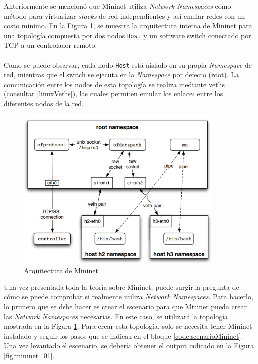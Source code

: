 Anteriormente se mencionó que Mininet utiliza \textit{Network Namespaces} como método para virtualizar \textit{stacks} de red independientes y así emular redes con un costo mínimo. En la Figura \ref{fig:mininet_arch}, se muestra la arquitectura interna de Mininet para una topología compuesta por dos nodos \texttt{Host} y un software switch conectado por TCP a un controlador remoto.\\
\\
Como se puede observar, cada nodo \texttt{Host} está aislado en su propia \textit{Namespace} de red, mientras que el switch se ejecuta en la \textit{Namespace} por defecto (root). La comunicación entre los nodos de esta topología se realiza mediante \gls{veth}s (consultar \ref{linuxVeths}), las cuales permiten emular los enlaces entre los diferentes nodos de la red.\\

\begin{figure}[ht]
    \centering
    \includegraphics[width=0.9\textwidth]{archivos/img/teoria/mn_arch.png}
    \caption{Arquitectura de Mininet \cite{heller2013reproducible}}
    \label{fig:mininet_arch}
\end{figure}

Una vez presentada toda la teoría sobre Mininet, puede surgir la pregunta de cómo se puede comprobar si realmente utiliza \textit{Network Namespaces}. Para hacerlo, lo primero que se debe hacer es crear el escenario para que Mininet pueda crear las \textit{Network Namespaces} necesarias. En este caso, se utilizará la topología mostrada en la Figura \ref{fig:mininet_arch}. Para crear esta topología, solo se necesita tener Mininet instalado y seguir los pasos que se indican en el bloque \ref{code:scenarioMininet}. Una vez levantado el escenario, se debería obtener el output indicado en la Figura \ref{fig:mininet_01}.


